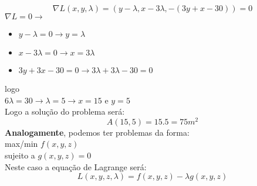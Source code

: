\documentclass{article}
\begin{document}
		$$\nabla L(x,y,\lambda) = (y-\lambda,x-3\lambda,-(3y+x-30))=0$$
		$\nabla L = 0 \to $
		\begin{itemize}
			\item $y-\lambda =0 \to y= \lambda$
			\item $x-3\lambda = 0 \to x = 3\lambda$
			\item $3y+3x-30 = 0 \to 3\lambda+3\lambda-30 = 0$
		\end{itemize}
		logo\\
		$6\lambda =30 \to \lambda = 5 \to x = 15$ e $y=5$\\
		Logo a solução do problema será:
		$$A(15,5) = 15.5=75m^2$$
		\textbf{Analogamente}, podemos ter problemas da forma:\\
		max/min $f(x,y,z)$\\
		sujeito a $g(x,y,z)=0$\\
		Neste caso a equação de Lagrange será:
		$$L(x,y,z,\lambda) = f(x,y,z) - \lambda g(x,y,z)$$
 
\end{document}
